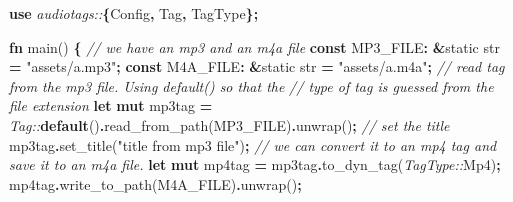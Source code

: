 \documentclass[
]{book}
\newenvironment{Shaded}{\begin{snugshade}}{\end{snugshade}}
\newcommand{\CommentTok}[1]{\textcolor[rgb]{0.56,0.35,0.01}{\textit{#1}}}
\newcommand{\DataTypeTok}[1]{\textcolor[rgb]{0.13,0.29,0.53}{#1}}
\newcommand{\KeywordTok}[1]{\textcolor[rgb]{0.13,0.29,0.53}{\textbf{#1}}}
\newcommand{\NormalTok}[1]{#1}
\newcommand{\OperatorTok}[1]{\textcolor[rgb]{0.81,0.36,0.00}{\textbf{#1}}}
\newcommand{\OtherTok}[1]{\textcolor[rgb]{0.56,0.35,0.01}{#1}}
\newcommand{\PreprocessorTok}[1]{\textcolor[rgb]{0.56,0.35,0.01}{\textit{#1}}}
\newcommand{\StringTok}[1]{\textcolor[rgb]{0.31,0.60,0.02}{#1}}
\begin{document}
\begin{Shaded}
\begin{Highlighting}[]

\KeywordTok{use} \PreprocessorTok{audiotags::}\OperatorTok{\{}\NormalTok{Config}\OperatorTok{,}\NormalTok{ Tag}\OperatorTok{,}\NormalTok{ TagType}\OperatorTok{\};}

\KeywordTok{fn}\NormalTok{ main() }\OperatorTok{\{}
    \CommentTok{// we have an mp3 and an m4a file}
    \KeywordTok{const}\NormalTok{ MP3\_FILE}\OperatorTok{:} \OperatorTok{\&}\OtherTok{\textquotesingle{}static} \DataTypeTok{str} \OperatorTok{=} \StringTok{"assets/a.mp3"}\OperatorTok{;}
    \KeywordTok{const}\NormalTok{ M4A\_FILE}\OperatorTok{:} \OperatorTok{\&}\OtherTok{\textquotesingle{}static} \DataTypeTok{str} \OperatorTok{=} \StringTok{"assets/a.m4a"}\OperatorTok{;}
    \CommentTok{// read tag from the mp3 file. Using \textasciigrave{}default()\textasciigrave{} so that the}
    \CommentTok{// type of tag is guessed from the file extension}
    \KeywordTok{let} \KeywordTok{mut}\NormalTok{ mp3tag }\OperatorTok{=} \PreprocessorTok{Tag::}\KeywordTok{default}\NormalTok{()}\OperatorTok{.}\NormalTok{read\_from\_path(MP3\_FILE)}\OperatorTok{.}\NormalTok{unwrap()}\OperatorTok{;}
    \CommentTok{// set the title}
\NormalTok{    mp3tag}\OperatorTok{.}\NormalTok{set\_title(}\StringTok{"title from mp3 file"}\NormalTok{)}\OperatorTok{;}
    \CommentTok{// we can convert it to an mp4 tag and save it to an m4a file.}
    \KeywordTok{let} \KeywordTok{mut}\NormalTok{ mp4tag }\OperatorTok{=}\NormalTok{ mp3tag}\OperatorTok{.}\NormalTok{to\_dyn\_tag(}\PreprocessorTok{TagType::}\NormalTok{Mp4)}\OperatorTok{;}
\NormalTok{    mp4tag}\OperatorTok{.}\NormalTok{write\_to\_path(M4A\_FILE)}\OperatorTok{.}\NormalTok{unwrap()}\OperatorTok{;}


\end{Highlighting}
\end{Shaded}
\end{document}
